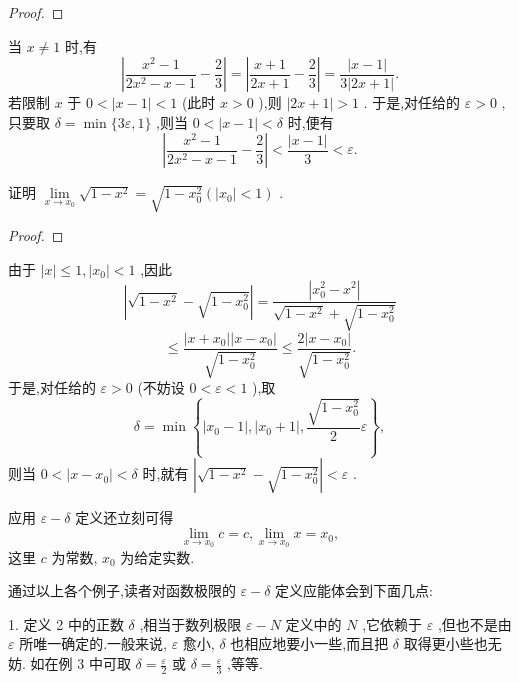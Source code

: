 \begin{proof}

\end{proof}
当 \(x \neq  1\) 时,有
\[
\left| {\frac{{x}^{2} - 1}{2{x}^{2} - x - 1} - \frac{2}{3}}\right|  = \left| {\frac{x + 1}{{2x} + 1} - \frac{2}{3}}\right|  = \frac{\left| x - 1\right| }{3\left| {{2x} + 1}\right| }.
\]
若限制 \(x\) 于 \(0 < \left| {x - 1}\right|  < 1\) (此时 \(x > 0\) ),则 \(\left| {{2x} + 1}\right|  > 1\) . 于是,对任给的 \(\varepsilon  > 0\) ,只要取 \(\delta  = \min \{ {3\varepsilon },1\}\) ,则当 \(0 < \left| {x - 1}\right|  < \delta\) 时,便有
\[
\left| {\frac{{x}^{2} - 1}{2{x}^{2} - x - 1} - \frac{2}{3}}\right|  < \frac{\left| x - 1\right| }{3} < \varepsilon .
\]
\begin{example}

\end{example}
证明 \(\mathop{\lim }\limits_{{x \rightarrow  {x}_{0}}}\sqrt{1 - {x}^{2}} = \sqrt{1 - {x}_{0}^{2}}\left( {\left| {x}_{0}\right|  < 1}\right)\) .

\begin{proof}

\end{proof}
由于 \(\left| x\right|  \leq  1,\left| {x}_{0}\right|  < 1\) ,因此
\[
\left| {\sqrt{1 - {x}^{2}} - \sqrt{1 - {x}_{0}^{2}}}\right|  = \frac{\left| {x}_{0}^{2} - {x}^{2}\right| }{\sqrt{1 - {x}^{2}} + \sqrt{1 - {x}_{0}^{2}}}
\]
\[
\leq  \frac{\left| {x + {x}_{0}}\right| \left| {x - {x}_{0}}\right| }{\sqrt{1 - {x}_{0}^{2}}} \leq  \frac{2\left| {x - {x}_{0}}\right| }{\sqrt{1 - {x}_{0}^{2}}}.
\]
于是,对任给的 \(\varepsilon  > 0\) (不妨设 \(0 < \varepsilon  < 1\) ),取
\[
\delta  = \min \left\{  {\left| {{x}_{0} - 1}\right| ,\left| {{x}_{0} + 1}\right| ,\frac{\sqrt{1 - {x}_{0}^{2}}}{2}\varepsilon }\right\}  ,
\]
则当 \(0 < \left| {x - {x}_{0}}\right|  < \delta\) 时,就有 \(\left| {\sqrt{1 - {x}^{2}} - \sqrt{1 - {x}_{0}^{2}}}\right|  < \varepsilon\) .

应用 \(\varepsilon  - \delta\) 定义还立刻可得
\[
\mathop{\lim }\limits_{{x \rightarrow  {x}_{0}}}c = c,\mathop{\lim }\limits_{{x \rightarrow  {x}_{0}}}x = {x}_{0},
\]
这里 \(c\) 为常数, \({x}_{0}\) 为给定实数.

通过以上各个例子,读者对函数极限的 \(\varepsilon  - \delta\) 定义应能体会到下面几点:

1. 定义 2 中的正数 \(\delta\) ,相当于数列极限 \(\varepsilon  - N\) 定义中的 \(N\) ,它依赖于 \(\varepsilon\) ,但也不是由 \(\varepsilon\) 所唯一确定的.一般来说, \(\varepsilon\) 愈小, \(\delta\) 也相应地要小一些,而且把 \(\delta\) 取得更小些也无妨. 如在例 3 中可取 \(\delta  = \frac{\varepsilon }{2}\) 或 \(\delta  = \frac{\varepsilon }{3}\) ,等等.

